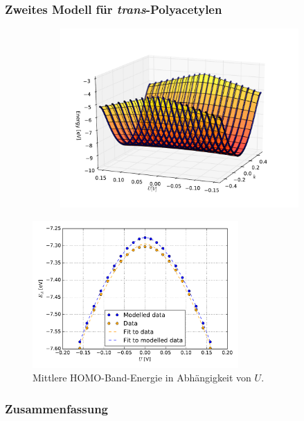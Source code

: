 \begin{frame}
\frametitle{Zweites Modell für \emph{trans}-Polyacetylen}
\begin{figure}
\begin{subfigure}{0.3\textwidth}
\centering
{}
\end{subfigure}
\begin{subfigure}{0.68\textwidth}
\centering
\includegraphics[width = \textwidth]{Images/polyacetylene/charging/3D/figure_1-2}
\end{subfigure}
\end{figure}
\end{frame}

\begin{frame}
\begin{figure}
	\centering
	\includegraphics[width = 0.7\textwidth]{Images/polyacetylene/charging/Homo_energy_charge}
	\caption{Mittlere HOMO-Band-Energie in Abhängigkeit von $U$.}
	\label{image_HOMO_average_polyacetylene}
\end{figure}
\end{frame}

\begin{frame}
\frametitle{Zusammenfassung}
\end{frame}